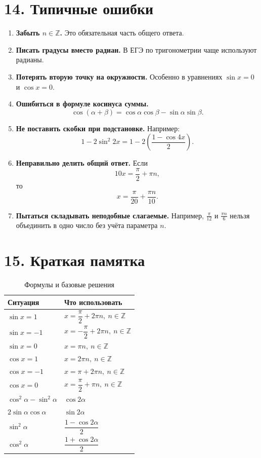 \documentclass[a4paper,12pt]{article}
\newcommand{\important}[1]{\textcolor{darkaccent}{\textbf{#1}}}
\newcommand{\Z}{\mathbb{Z}}
\begin{document}
\section*{14. Типичные ошибки}

\begin{enumerate}
    \item \important{Забыть \(n\in\Z\).} Это обязательная часть общего ответа.
    \item \important{Писать градусы вместо радиан.} В ЕГЭ по тригонометрии чаще используют радианы.
    \item \important{Потерять вторую точку на окружности.} Особенно в уравнениях \(\sin x=0\) и \(\cos x=0\).
    \item \important{Ошибиться в формуле косинуса суммы.}
    \[
        \cos(\alpha+\beta)=\cos\alpha\cos\beta-\sin\alpha\sin\beta.
    \]
    \item \important{Не поставить скобки при подстановке.} Например:
    \[
        1-2\sin^2 2x
        =
        1-2\left(\frac{1-\cos4x}{2}\right).
    \]
    \item \important{Неправильно делить общий ответ.} Если
    \[
        10x=\frac{\pi}{2}+\pi n,
    \]
    то
    \[
        x=\frac{\pi}{20}+\frac{\pi n}{10}.
    \]
    \item \important{Пытаться складывать неподобные слагаемые.} Например, \(\frac{\pi}{12}\) и \(\frac{\pi n}{6}\) нельзя объединить в одно число без учёта параметра \(n\).
\end{enumerate}

\section*{15. Краткая памятка}

\renewcommand{\arraystretch}{1.35}
\begin{table}[h!]
\caption{Формулы и базовые решения}
\centering
\begin{tabularx}{\linewidth}{@{}lX@{}}
\toprule
\textbf{Ситуация} & \textbf{Что использовать} \\
\midrule
\(\sin x=1\) & \(x=\dfrac{\pi}{2}+2\pi n,\ n\in\Z\) \\
\(\sin x=-1\) & \(x=-\dfrac{\pi}{2}+2\pi n,\ n\in\Z\) \\
\(\sin x=0\) & \(x=\pi n,\ n\in\Z\) \\
\(\cos x=1\) & \(x=2\pi n,\ n\in\Z\) \\
\(\cos x=-1\) & \(x=\pi+2\pi n,\ n\in\Z\) \\
\(\cos x=0\) & \(x=\dfrac{\pi}{2}+\pi n,\ n\in\Z\) \\
\(\cos^2\alpha-\sin^2\alpha\) & \(\cos 2\alpha\) \\
\(2\sin\alpha\cos\alpha\) & \(\sin 2\alpha\) \\
\(\sin^2\alpha\) & \(\dfrac{1-\cos2\alpha}{2}\) \\
\(\cos^2\alpha\) & \(\dfrac{1+\cos2\alpha}{2}\) \\
\bottomrule
\end{tabularx}
\end{table}
\end{document}
